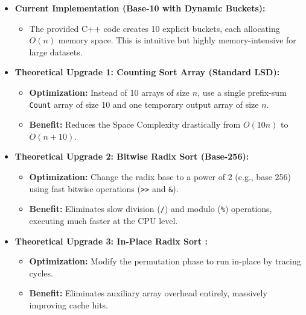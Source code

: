         \begin{itemize}
            \item \textbf{Current Implementation (Base-10 with Dynamic Buckets):}
            \begin{itemize}
                \item The provided C++ code creates 10 explicit buckets, each allocating $O(n)$ memory space. This is intuitive but highly memory-intensive for large datasets.
            \end{itemize}
            \item \textbf{Theoretical Upgrade 1: Counting Sort Array (Standard LSD):}
            \begin{itemize}
                \item \textbf{Optimization:} Instead of 10 arrays of size $n$, use a single prefix-sum \texttt{Count} array of size 10 and one temporary output array of size $n$.
                \item \textbf{Benefit:} Reduces the Space Complexity drastically from $O(10n)$ to $O(n + 10)$.
            \end{itemize}
            \item \textbf{Theoretical Upgrade 2: Bitwise Radix Sort (Base-256):}
            \begin{itemize}
                \item \textbf{Optimization:} Change the radix base to a power of 2 (e.g., base 256) using fast bitwise operations (\texttt{>>} and \texttt{\&}).
                \item \textbf{Benefit:} Eliminates slow division (\texttt{/}) and modulo (\texttt{\%}) operations, executing much faster at the CPU level.
            \end{itemize}
            \item \textbf{Theoretical Upgrade 3: In-Place Radix Sort \cite{shun2019parallel}:}
            \begin{itemize}
                \item \textbf{Optimization:} Modify the permutation phase to run in-place by tracing cycles.
                \item \textbf{Benefit:} Eliminates auxiliary array overhead entirely, massively improving cache hits.
            \end{itemize}
        \end{itemize}